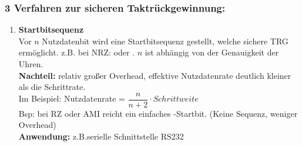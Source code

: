 \documentclass[10pt,a4paper]{scrartcl}
\begin{document}
\subsubsection*{3 Verfahren zur sicheren Taktrückgewinnung:}
\begin{enumerate}
	\item \textbf{Startbitsequenz} \\
	Vor $n$ Nutzdatenbit wird eine Startbitsequenz gestellt, welche sichere TRG ermöglicht. z.B. bei NRZ: \grqq oder  \grqq. $n$ ist abhängig von der Genauigkeit der Uhren. \\
	\textbf{Nachteil:} relativ großer Overhead, effektive Nutzdatenrate deutlich kleiner als die Schrittrate.\\
	\noindent\hspace*{2em}%
	Im Beispiel: Nutzdatenrate = $\dfrac{n}{n+2}\cdot Schrittweite$\\
	Bsp: bei RZ oder AMI reicht ein einfaches  \grqq-Startbit. (Keine \glqq Sequenz\grqq, weniger Overhead)\\
	\textbf{Anwendung:} z.B.serielle Schnittstelle RS232
	

\end{enumerate}
\end{document}
